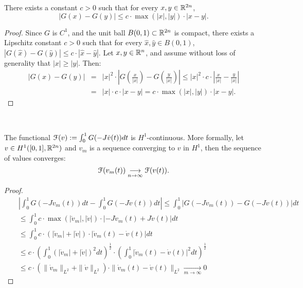 \documentclass[../capacities_main.tex]{subfiles}
\begin{document}
\begin{Lemma}\label{Lemma:Lipschitz}
	There exists a constant $c>0$ such that for every $x,y\in{\mathbb R}^{2n}$, 
	\[
	|G(x)-G(y)|\leq c\cdot \max(|x|,|y|)\cdot |x-y|.
	\]
\end{Lemma}

\begin{proof}
	Since $G$ is $C^1$, and the unit ball $B(0,1)\subset{\mathbb R}^{2n}$ is compact, there exists a Lipschitz constant $c>0$ such that for every $\hat x,\hat y\in B(0,1)$, $|G(\hat x)-G(\hat y)|\leq c\cdot |\hat x-\hat y|$. Let $x,y\in {\mathbb R}^n$, and assume without loss of generality that $|x|\geq|y|$. Then:
	\begin{eqnarray*}
		|G(x)-G(y)| &=& |x|^2\cdot \left|G\left(\frac{x}{|x|}\right)-G\left(\frac{y}{|x|}\right)\right|\leq |x|^2 \cdot c\cdot \left|\frac{x}{|x|}-\frac{y}{|x|}\right| \\
		&=& |x| \cdot c\cdot \left|x-y\right|  = c\cdot \max(|x|,|y|)\cdot |x-y|.
	\end{eqnarray*}
\end{proof}\

\begin{Lemma}
	The functional ${\mathcal F}(v):=\int_0^1 G(-J \dot v(t))dt$ is $H^1$-continuous. More formally, let $v\in H^1([0,1],{\mathbb R}^{2n})$ and $v_m$ is a sequence converging to $v$ in $H^1$, then the sequence of values converges:
	\[
	{\mathcal F}(v_m(t))\underset{n\rightarrow\infty}{\longrightarrow} {\mathcal F}(v(t)).
	\]
\end{Lemma}
\begin{proof}
	
	\begin{eqnarray*}
		&&\left|\int_0^1 G(-J \dot v_m(t))dt-\int_0^1 G(-J \dot v(t))dt\right| \leq \int_0^1 \left| G(-J \dot v_m(t))- G(-J\dot v(t))\right|dt\\
		&& \leq \int_0^1 c\cdot \max(|\dot v_m|,|\dot v|)\cdot |-J \dot v_m(t)+ J\dot v(t)|dt\\
		&& \leq \int_0^1 c\cdot (|\dot v_m|+|\dot v|)\cdot |\dot v_m(t)-\dot v(t)|dt\\
		&& \leq c\cdot \left(\int_0^1 (|\dot v_m|+|\dot v|)^2 dt\right)^{\frac{1}{2}}\cdot \left(\int_0^1 |\dot v_m(t)-\dot v(t)|^2 dt\right)^{\frac{1}{2}}\\
		&& \leq c\cdot (\|\dot v_m\|_{L^2}+\|\dot v\|_{L^2})\cdot \|\dot v_m(t)-\dot v(t)\|_{L^2} \underset{m\rightarrow\infty}{\longrightarrow}0
	\end{eqnarray*}
	
\end{proof}\
\end{document}
